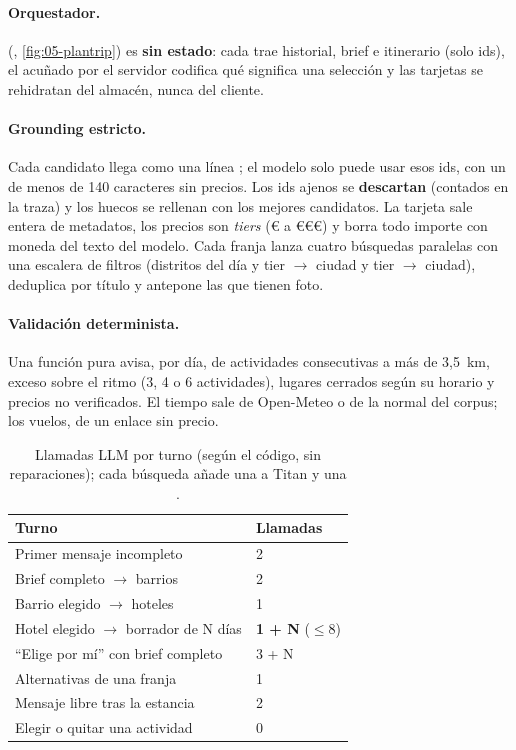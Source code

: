 \paragraph{Orquestador.}  (, \cref{fig:05-plantrip}) es \textbf{sin
estado}: cada  trae historial, brief e itinerario (solo ids), el
 acuñado por el servidor codifica qué significa una selección y las tarjetas se
rehidratan del almacén, nunca del cliente.

\paragraph{Grounding estricto.} Cada candidato llega como una línea
; el modelo solo puede usar esos
ids, con un  de menos de 140 caracteres sin precios. Los ids ajenos se
\textbf{descartan} (contados en la traza) y los huecos se rellenan con los mejores candidatos.
La tarjeta sale entera de metadatos, los precios son \emph{tiers} (€ a €€€) y 
borra todo importe con moneda del texto del modelo. Cada
franja lanza cuatro búsquedas paralelas con una escalera de filtros (distritos del día y tier
$\rightarrow$ ciudad y tier $\rightarrow$ ciudad), deduplica por título y antepone las que tienen
foto.

\paragraph{Validación determinista.} Una función pura avisa, por día, de actividades consecutivas
a más de 3,5~km, exceso sobre el ritmo (3, 4 o 6 actividades), lugares cerrados según su horario
y precios no verificados. El tiempo sale de Open-Meteo o de la normal del
corpus; los vuelos, de un enlace sin precio.

\begin{table}[tb]\centering\footnotesize
\caption{Llamadas LLM por turno (según el código, sin reparaciones); cada búsqueda añade una a Titan y una .}
\label{tab:05-llamadas}
\begin{tabularx}{\columnwidth}{Yl}
\toprule
Turno & Llamadas \\
\midrule
Primer mensaje incompleto & 2 \\
Brief completo $\rightarrow$ barrios & 2 \\
Barrio elegido $\rightarrow$ hoteles & 1 \\
Hotel elegido $\rightarrow$ borrador de N días & \textbf{1 + N} ($\leq$8) \\
``Elige por mí'' con brief completo & 3 + N \\
Alternativas de una franja & 1 \\
Mensaje libre tras la estancia & 2 \\
Elegir o quitar una actividad & 0 \\
\bottomrule
\end{tabularx}
\end{table}

